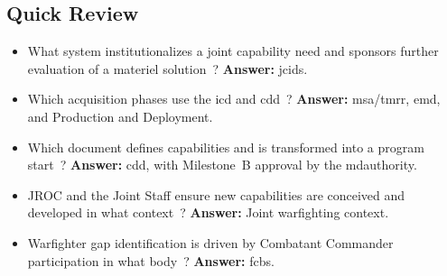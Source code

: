 \documentclass[../main.tex]{subfiles}
\begin{document}
\subsection{Quick Review}
\begin{itemize}
  \item What system institutionalizes a joint capability need and sponsors further evaluation of a materiel solution~\autocite{edo-3-3-3-jcids-2025}? \textbf{Answer:} \ac{jcids}.
  \item Which acquisition phases use the \ac{icd} and \ac{cdd}~\autocite{edo-3-3-3-jcids-2025}? \textbf{Answer:} \ac{msa}/\ac{tmrr}, \ac{emd}, and Production and Deployment.
  \item Which document defines capabilities and is transformed into a program start~\autocite{edo-3-3-3-jcids-2025}? \textbf{Answer:} \ac{cdd}, with Milestone~B approval by the \ac{mdauthority}.
  \item JROC and the Joint Staff ensure new capabilities are conceived and developed in what context~\autocite{edo-3-3-3-jcids-2025}? \textbf{Answer:} Joint warfighting context.
  \item Warfighter gap identification is driven by Combatant Commander participation in what body~\autocite{edo-3-3-3-jcids-2025}? \textbf{Answer:} \acp{fcb}.
\end{itemize}

\end{document}
